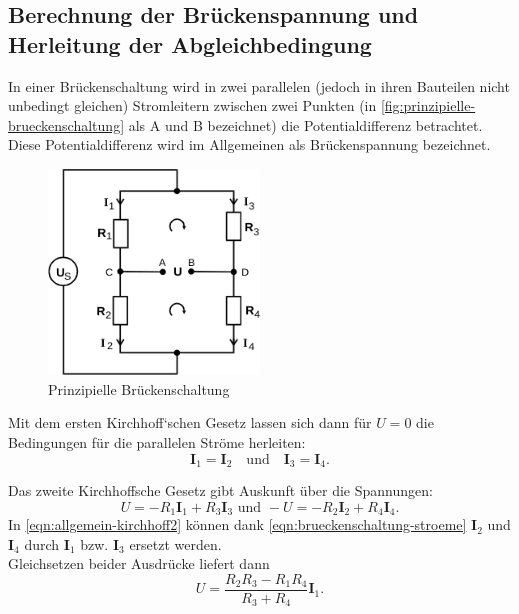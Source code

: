 \subsection{Berechnung der Brückenspannung und Herleitung der 
Abgleichbedingung}
\label{sec:abgleichbedingung}

In einer Brückenschaltung wird in zwei parallelen 
(jedoch in ihren Bauteilen nicht unbedingt gleichen) 
Stromleitern zwischen zwei Punkten 
(in \autoref{fig:prinzipielle-brueckenschaltung} als A und B bezeichnet) 
die Potentialdifferenz betrachtet.
Diese Potentialdifferenz wird im Allgemeinen als Brückenspannung bezeichnet.

\begin{figure}[H]
	\centering
	\includegraphics[width=0.5\textwidth]{bilder/prinzipielle-brueckenschaltung.png}
	\caption{Prinzipielle Brückenschaltung \cite{sample}}
	\label{fig:prinzipielle-brueckenschaltung}
\end{figure}

Mit dem ersten Kirchhoff`schen Gesetz lassen sich dann für $U=0$ die Bedingungen für
die parallelen Ströme herleiten:
\begin{equation}
	\mathbf{I}_1 = \mathbf{I}_2
	\quad \text{und} \quad
	\mathbf{I}_3 = \mathbf{I}_4.
	\label{eqn:brueckenschaltung-stroeme}
\end{equation}

Das zweite Kirchhoffsche Gesetz gibt Auskunft über die Spannungen:
\begin{equation}
	U = - R_1 \mathbf{I}_1 + R_3 \mathbf{I}_3
	\text{ und }
	-U = -R_2 \mathbf{I}_2 + R_4 \mathbf{I}_4.
	\label{eqn:allgemein-kirchhoff2}
\end{equation}
In \autoref{eqn:allgemein-kirchhoff2} können dank \autoref{eqn:brueckenschaltung-stroeme} 
$\mathbf{I}_2$ und $\mathbf{I}_4$ durch $\mathbf{I}_1$ bzw. $\mathbf{I}_3$ ersetzt werden.
\\
Gleichsetzen beider Ausdrücke liefert dann
\begin{equation}
	U = \frac{R_2 R_3 - R_1 R_4}{R_3 + R_4} \mathbf{I}_1.
	\label{eqn:ablgeich-abhaengig}
\end{equation}

